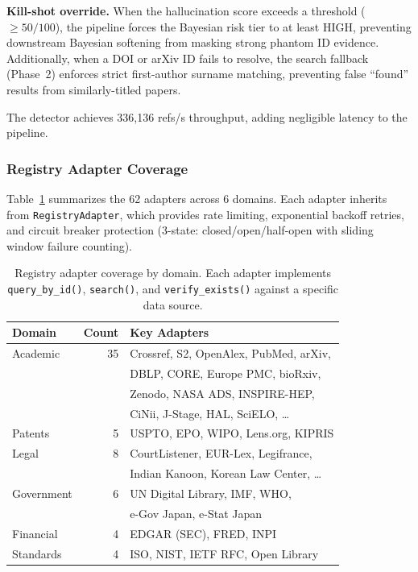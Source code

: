 \documentclass[sigconf,nonacm]{acmart}
\begin{document}
\noindent\textbf{Kill-shot override.}
When the hallucination score exceeds a threshold ($\geq 50/100$), the pipeline forces the Bayesian risk tier to at least HIGH, preventing downstream Bayesian softening from masking strong phantom ID evidence.
Additionally, when a DOI or arXiv ID fails to resolve, the search fallback (Phase~2) enforces strict first-author surname matching, preventing false ``found'' results from similarly-titled papers.

The detector achieves 336,136 refs/s throughput, adding negligible latency to the pipeline.

\subsubsection{Registry Adapter Coverage}

Table~\ref{tab:registries} summarizes the 62 adapters across 6 domains.
Each adapter inherits from \texttt{RegistryAdapter}, which provides rate limiting, exponential backoff retries, and circuit breaker protection (3-state: closed/open/half-open with sliding window failure counting).

\begin{table}[t]
\caption{Registry adapter coverage by domain. Each adapter implements \texttt{query\_by\_id()}, \texttt{search()}, and \texttt{verify\_exists()} against a specific data source.}
\label{tab:registries}
\centering
\small
\begin{tabular}{lrl}
\toprule
\textbf{Domain} & \textbf{Count} & \textbf{Key Adapters} \\
\midrule
Academic & 35 & Crossref, S2, OpenAlex, PubMed, arXiv, \\
         &    & DBLP, CORE, Europe PMC, bioRxiv, \\
         &    & Zenodo, NASA ADS, INSPIRE-HEP, \\
         &    & CiNii, J-Stage, HAL, SciELO, \ldots \\
Patents  & 5  & USPTO, EPO, WIPO, Lens.org, KIPRIS \\
Legal    & 8  & CourtListener, EUR-Lex, Legifrance, \\
         &    & Indian Kanoon, Korean Law Center, \ldots \\
Government & 6 & UN Digital Library, IMF, WHO, \\
           &   & e-Gov Japan, e-Stat Japan \\
Financial  & 4 & EDGAR (SEC), FRED, INPI \\
Standards  & 4 & ISO, NIST, IETF RFC, Open Library \\
\bottomrule
\end{tabular}
\end{table}
\end{document}
